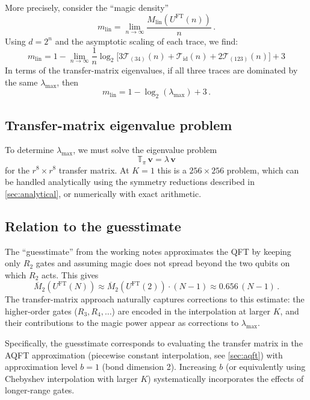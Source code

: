 \documentclass[11pt,a4paper]{article}
\theoremstyle{definition}
\theoremstyle{remark}
\newcommand{\Mlin}{M_{\mathrm{lin}}}
\newcommand{\Mtwo}{\overline{M}_2}
\newcommand{\UFT}{U^{\mathrm{FT}}}
\begin{document}
More precisely, consider the ``magic density''
\begin{equation}
  m_{\mathrm{lin}} = \lim_{n\to\infty}\frac{\Mlin(\UFT(n))}{n}\,.
\end{equation}
Using $d=2^n$ and the asymptotic scaling of each trace, we find:
\begin{equation}\label{eq:magic_density}
  \boxed{
  m_{\mathrm{lin}} = 1 - \lim_{n\to\infty}\frac{1}{n}\log_2
  \bigl[3\mathcal{T}_{(34)}(n)+\mathcal{T}_{\mathrm{id}}(n)+2\mathcal{T}_{(123)}(n)\bigr]
  + 3
  }
\end{equation}
In terms of the transfer-matrix eigenvalues, if all three traces are dominated by the same $\lambda_{\max}$, then
\begin{equation}
  m_{\mathrm{lin}} = 1 - \log_2(\lambda_{\max}) + 3\,.
\end{equation}

\subsection{Transfer-matrix eigenvalue problem}

To determine $\lambda_{\max}$, we must solve the eigenvalue problem
\begin{equation}
  \mathbb{T}_\pi\,\mathbf{v} = \lambda\,\mathbf{v}
\end{equation}
for the $r^8\times r^8$ transfer matrix.  At $K=1$ this is a $256\times 256$ problem, which can be handled analytically using the symmetry reductions described in \cref{sec:analytical}, or numerically with exact arithmetic.

\subsection{Relation to the guesstimate}

The ``guesstimate'' from the working notes approximates the QFT by keeping only $R_2$ gates and assuming magic does not spread beyond the two qubits on which $R_2$ acts. This gives
\begin{equation}\label{eq:guesstimate}
  \Mtwo(\UFT(N)) \approx \Mtwo(\UFT(2))\cdot(N-1) \approx 0.656\,(N-1)\,.
\end{equation}
The transfer-matrix approach naturally captures corrections to this estimate: the higher-order gates ($R_3, R_4, \ldots$) are encoded in the interpolation at larger $K$, and their contributions to the magic power appear as corrections to $\lambda_{\max}$.

Specifically, the guesstimate corresponds to evaluating the transfer matrix in the AQFT approximation (piecewise constant interpolation, see \cref{sec:aqft}) with approximation level $b=1$ (bond dimension 2).  Increasing $b$ (or equivalently using Chebyshev interpolation with larger $K$) systematically incorporates the effects of longer-range gates.
\end{document}
